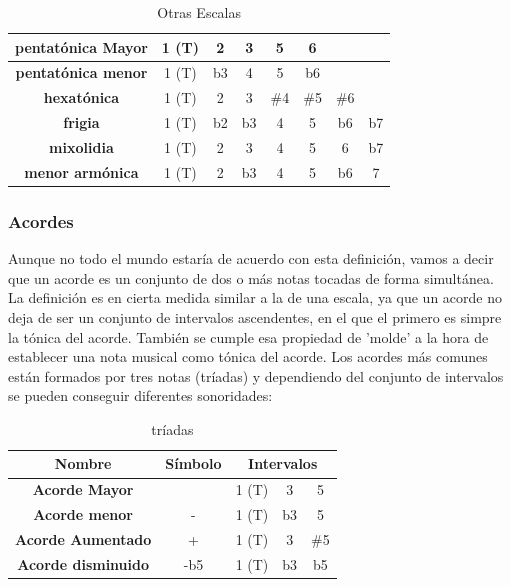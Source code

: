 \begin{table}[h]
    \centering
    \begin{tabular}{c|c|c|c|c|c|c|c}       
        \textbf{pentatónica Mayor} & 1 (T) & 2 & 3 & 5 & \multicolumn{1}{c}{6} \\
        \hline
        \textbf{pentatónica menor} & 1 (T) & b3 & 4 & 5 & \multicolumn{1}{c}{b6} \\
        \hline
        \textbf{hexatónica} & 1 (T) & 2 & 3 & \#4 & \#5 & \multicolumn{1}{c}{\#6}  \\
        \hline
        \textbf{frigia} & 1 (T) & b2 & b3 & 4 & 5 & b6 & b7 \\
        \hline
        \textbf{mixolidia} & 1 (T) & 2 & 3 & 4 & 5 & 6 & b7 \\
        \hline
        \textbf{menor armónica} & 1 (T) & 2 & b3 & 4 & 5 & b6 & 7 \\      
    \end{tabular}
    \caption{Otras Escalas}
    \label{tab:otras_escalas}
\end{table}

    \subsubsection{Acordes}\label{sec:arm:acordes}

    Aunque no todo el mundo estaría de acuerdo con esta definición, vamos a decir que un acorde es un conjunto de dos o más notas tocadas de forma simultánea. La definición es en cierta medida similar a la de una escala, ya que un acorde no deja de ser un conjunto de intervalos ascendentes, en el que el primero es simpre la tónica del acorde. También se cumple esa propiedad de 'molde' a la hora de establecer una nota musical como tónica del acorde. Los acordes más comunes están formados por tres notas (tríadas) y dependiendo del conjunto de intervalos se pueden conseguir diferentes sonoridades:

\begin{table}[h]
    \centering
    \begin{tabular}{c|c|c|c|c}       
        \textbf{Nombre} & \textbf{Símbolo} & \multicolumn{3}{c}{\textbf{Intervalos}} \\
        \hline
        \hline
        \textbf{Acorde Mayor} & & 1 (T) & 3 & 5 \\
        \hline
        \textbf{Acorde menor} & - & 1 (T) & b3 & 5 \\
        \hline
        \textbf{Acorde Aumentado} & + & 1 (T) & 3 & \#5 \\
        \hline
        \textbf{Acorde disminuido} & -b5 & 1 (T) & b3 & b5 \\
    \end{tabular}
    \caption{tríadas}
    \label{tab:triads}
\end{table}


